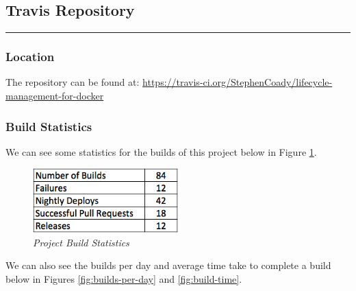 \subsection{Travis Repository} 
\label{appendix:travis}
\rule{\textwidth}{0.4pt}
\subsubsection{Location}
The repository can be found at:  \url{https://travis-ci.org/StephenCoady/lifecycle-management-for-docker}

\subsubsection{Build Statistics}
We can see some statistics for the builds of this project below in Figure \ref{fig:build-stats}.

\begin{figure}[!ht]
\centering
\includegraphics*[width=0.5\textwidth]{images/build-stats}
\caption{\em Project Build Statistics}
\label{fig:build-stats}
\end{figure}

We can also see the builds per day and average time take to complete a build below in Figures \ref{fig:builds-per-day} and \ref{fig:build-time}.

